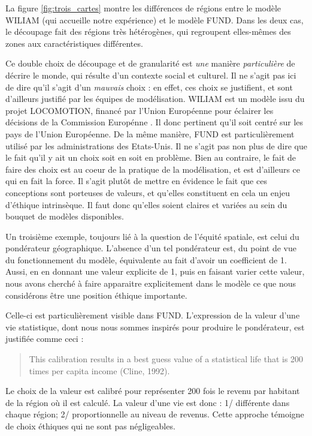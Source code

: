 La figure \ref{fig:trois_cartes} montre les différences de régions entre le modèle WILIAM (qui accueille notre expérience) et le modèle FUND. Dans les deux cas, le découpage fait des régions très hétérogènes, qui regroupent elles-mêmes des zones aux caractéristiques différentes. 

Ce double choix de découpage et de granularité est \emph{une} manière \emph{particulière} de décrire le monde, qui résulte d'un contexte social et culturel. Il ne s'agit pas ici de dire qu'il s'agit d'un \emph{mauvais} choix : en effet, ces choix se justifient, et sont d'ailleurs justifié par les équipes de modélisation. WILIAM est un modèle issu du projet LOCOMOTION, financé par l'Union Européenne pour éclairer les décisions de la Commission Europénne \cite{locomotion-h2020_locomotion-h2020wiliam_model_vensim_2024}. Il donc pertinent qu'il soit centré sur les pays de l'Union Européenne. De la même manière, FUND est particulièrement utilisé par les administrations des Etats-Unis. Il ne s'agit pas non plus de dire que le fait qu'il y ait un choix soit en soit en problème. Bien au contraire, le fait de faire des choix est au coeur de la pratique de la modélisation, et est d'ailleurs ce qui en fait la force. Il s'agit plutôt de mettre en évidence le fait que ces conceptions sont porteuses de valeurs, et qu'elles constituent en cela un enjeu d'éthique intrinsèque. Il faut donc qu'elles soient claires et variées au sein du bouquet de modèles disponibles. 

Un troisième exemple, toujours lié à la question de l'équité spatiale, est celui du pondérateur géographique. L'absence d'un tel pondérateur est, du point de vue du fonctionnement du modèle, équivalente au fait d'avoir un coefficient de 1. Aussi, en en donnant une valeur explicite de 1, puis en faisant varier cette valeur, nous avons cherché à faire apparaitre explicitement dans le modèle ce que nous considérons être une position éthique importante. 

Celle-ci est particulièrement visible dans FUND. L'expression de la valeur d'une vie statistique, dont nous nous sommes inspirés pour produire le pondérateur, est justifiée comme ceci : 

\begin{quote}
    This calibration results in a best guess value of a statistical life that is 200 times per capita income (Cline, 1992). 
\end{quote}
Le choix de la valeur est calibré pour représenter 200 fois le revenu par habitant de la région où il est calculé. La valeur d'une vie est donc : 1/ différente dans chaque région; 2/ proportionnelle au niveau de revenus. Cette approche témoigne de choix éthiques qui ne sont pas négligeables. 

